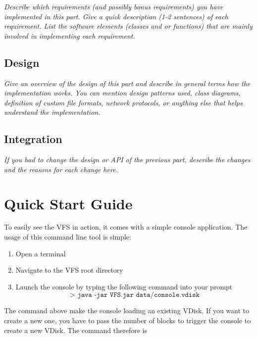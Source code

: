 \documentclass[a4paper,12pt]{article}
\begin{document}
\emph{Describe which requirements (and possibly bonus requirements) you have implemented in this part. Give a quick description (1-2 sentences) of each requirement. List the software elements (classes and or functions) that are mainly involved in implementing each requirement.}


\subsection{Design}

\emph{Give an overview of the design of this part and describe in general terms how the implementation works. You can mention design patterns used, class diagrams, definition of custom file formats, network protocols, or anything else that helps understand the implementation.}


\subsection{Integration}

\emph{If you had to change the design or API of the previous part, describe the changes and the reasons for each change here.}

\fi


\section{Quick Start Guide}

To easily see the VFS in action, it comes with a simple console application. The usage of this command line tool is simple:

\begin{enumerate}
\item Open a terminal
\item Navigate to the VFS root directory
\item Launch the console by typing the following command into your prompt
\[\texttt{> java -jar VFS.jar data/console.vdisk} \]
\end{enumerate}

The command above make the console loading an existing VDisk. If you want to create a new one, you have to pass the number of blocks to trigger the console to create a new VDisk. The command therefore is
\end{document}
